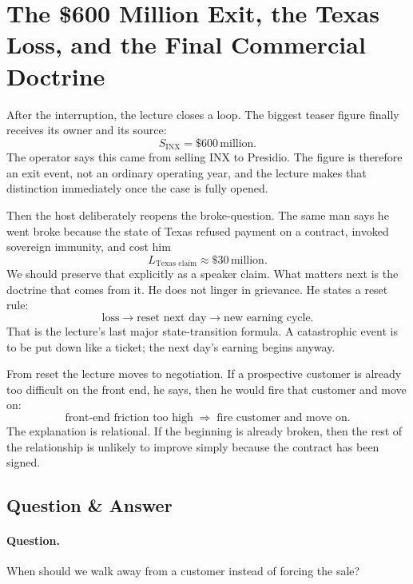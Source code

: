 \section{The \$600 Million Exit, the Texas Loss, and the Final Commercial Doctrine}

After the interruption, the lecture closes a loop. The biggest teaser figure finally receives its owner and its source:
\begin{equation}
S_{\text{INX}} = \$600\,\text{million}.
\end{equation}
The operator says this came from selling INX to Presidio. The figure is therefore an exit event, not an ordinary operating year, and the lecture makes that distinction immediately once the case is fully opened.

Then the host deliberately reopens the broke-question. The same man says he went broke because the state of Texas refused payment on a contract, invoked sovereign immunity, and cost him
\begin{equation}
L_{\text{Texas claim}} \approx \$30\,\text{million}.
\end{equation}
We should preserve that explicitly as a speaker claim. What matters next is the doctrine that comes from it. He does not linger in grievance. He states a reset rule:
\begin{equation}
\text{loss} \to \text{reset next day} \to \text{new earning cycle}.
\end{equation}
That is the lecture's last major state-transition formula. A catastrophic event is to be put down like a ticket; the next day's earning begins anyway.

From reset the lecture moves to negotiation. If a prospective customer is already too difficult on the front end, he says, then he would fire that customer and move on:
\begin{equation}
\text{front-end friction too high}
\;\Rightarrow\;
\text{fire customer and move on}.
\end{equation}
The explanation is relational. If the beginning is already broken, then the rest of the relationship is unlikely to improve simply because the contract has been signed.

\subsection{Question \& Answer}

\paragraph{Question.} When should we walk away from a customer instead of forcing the sale?

